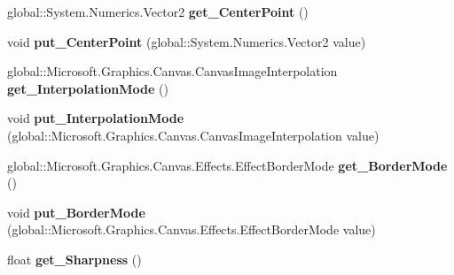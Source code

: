\begin{DoxyCompactItemize}
global\+::\+System.\+Numerics.\+Vector2 {\bfseries get\+\_\+\+Center\+Point} ()
\item 
\mbox{\label{interface_microsoft_1_1_graphics_1_1_canvas_1_1_effects_1_1_i_scale_effect_ae77c17d958bfacfc7652816c2fc67522}} 
void {\bfseries put\+\_\+\+Center\+Point} (global\+::\+System.\+Numerics.\+Vector2 value)
\item 
\mbox{\label{interface_microsoft_1_1_graphics_1_1_canvas_1_1_effects_1_1_i_scale_effect_a4fe4bd90b0fa1dfcf5e3831f15e73a81}} 
global\+::\+Microsoft.\+Graphics.\+Canvas.\+Canvas\+Image\+Interpolation {\bfseries get\+\_\+\+Interpolation\+Mode} ()
\item 
\mbox{\label{interface_microsoft_1_1_graphics_1_1_canvas_1_1_effects_1_1_i_scale_effect_aaaff922db5597526bd069b5b3cfa1bf3}} 
void {\bfseries put\+\_\+\+Interpolation\+Mode} (global\+::\+Microsoft.\+Graphics.\+Canvas.\+Canvas\+Image\+Interpolation value)
\item 
\mbox{\label{interface_microsoft_1_1_graphics_1_1_canvas_1_1_effects_1_1_i_scale_effect_ac46828996e589095068e0beff4165185}} 
global\+::\+Microsoft.\+Graphics.\+Canvas.\+Effects.\+Effect\+Border\+Mode {\bfseries get\+\_\+\+Border\+Mode} ()
\item 
\mbox{\label{interface_microsoft_1_1_graphics_1_1_canvas_1_1_effects_1_1_i_scale_effect_a56c46fac62fdf0f627612c3363b495f4}} 
void {\bfseries put\+\_\+\+Border\+Mode} (global\+::\+Microsoft.\+Graphics.\+Canvas.\+Effects.\+Effect\+Border\+Mode value)
\item 
\mbox{\label{interface_microsoft_1_1_graphics_1_1_canvas_1_1_effects_1_1_i_scale_effect_a76ce1ef01a06978e684a4618f550223f}} 
float {\bfseries get\+\_\+\+Sharpness} ()
\item 
\mbox{\label{interface_microsoft_1_1_graphics_1_1_canvas_1_1_effects_1_1_i_scale_effect_afab0f505adbbffee701a263c3e62fe43}} 

\end{DoxyCompactItemize}
